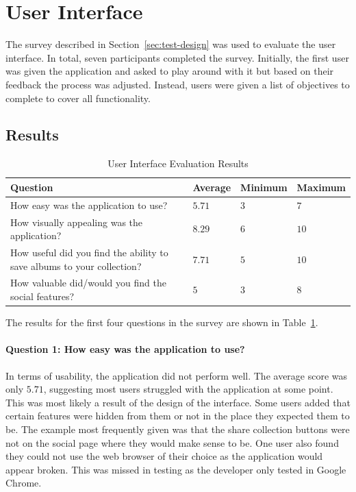 \section{User Interface}
The survey described in Section~\ref{sec:test-design} was used to evaluate the user interface. In total, seven participants completed the survey. Initially, the first user was given the application and asked to play around with it but based on their feedback the process was adjusted. Instead, users were given a list of objectives to complete to cover all functionality.

\subsection{Results}
\begin{table} [H]
    \centering
    \begin{tabular}{|m{5cm}|m{2cm}|m{2cm}|m{2cm}|}
        \hline
        \textbf{Question} & \textbf{Average} & \textbf{Minimum} & \textbf{Maximum} \\
        \hline
 How easy was the application to use? & $5.71$ & $3$ & $7$ \\
        \hline
 How visually appealing was the application? & $8.29$ & $6$ & $10$ \\
        \hline
 How useful did you find the ability to save albums to your collection? & $7.71$ & $5$ & $10$ \\
        \hline
 How valuable did/would you find the social features? & $5$ & $3$ & $8$ \\
        \hline
    \end{tabular}
    \caption{User Interface Evaluation Results}
    \label{tab:ui-evaluation-results}
\end{table}

The results for the first four questions in the survey are shown in Table~\ref{tab:ui-evaluation-results}.

\paragraph{Question 1: How easy was the application to use?}
In terms of usability, the application did not perform well. The average score was only $5.71$, suggesting most users struggled with the application at some point. This was most likely a result of the design of the interface. Some users added that certain features were hidden from them or not in the place they expected them to be. The example most frequently given was that the share collection buttons were not on the social page where they would make sense to be. One user also found they could not use the web browser of their choice as the application would appear broken. This was missed in testing as the developer only tested in Google Chrome.

